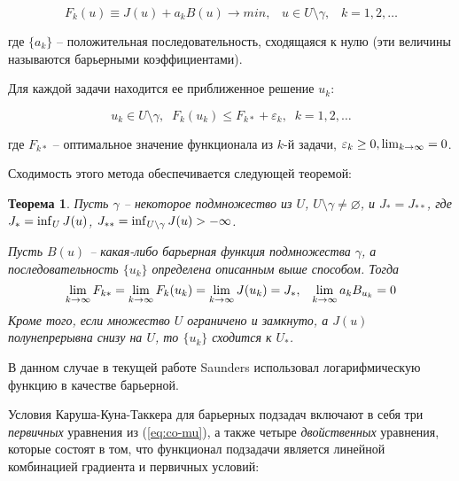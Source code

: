\documentclass[a4paper, 12pt, titlepage]{article}
\theoremstyle{definition}
\theoremstyle{plain}
\newtheorem{SmartTheorem}{Теорема}
\theoremstyle{plain}
\begin{document}
\begin{equation}
 F_{k}(u) \equiv J(u) + a_{k} B(u) \to min, \;\;\; u \in U \setminus \gamma, 
\;\;\;
 k = 1, 2, \ldots
\end{equation}

где $\{a_{k}\}$ -- положительная последовательность, сходящаяся к нулю (эти 
величины называются барьерными коэффициентами).

Для каждой задачи находится ее приближенное решение $u_{k}$:

\begin{equation}
 u_{k} \in U \setminus \gamma, \;\; F_{k}(u_{k}) \leq F_{k*} + \varepsilon_{k},
 \;\; k = 1, 2, \ldots
\end{equation}

где $F_{k*}$ -- оптимальное значение функционала из $k$-й задачи,
$\varepsilon_{k} \geq 0, \operatornamewithlimits{lim}_{k \to \infty} = 0$.

Сходимость этого метода обеспечивается следующей теоремой:

\begin{SmartTheorem}
 Пусть $\gamma$ -- некоторое подмножество из $U$,
 $U \setminus \gamma \neq \varnothing$, и $J_{*} = J_{**}$, где
 $J_{*} = \operatornamewithlimits{inf}_{U} J(u)$,
 $J_{**} = \operatornamewithlimits{inf}_{U \setminus \gamma} J(u) > -\infty$.
 
 Пусть $B(u)$ -- какая-либо барьерная функция подмножества $\gamma$, а
 последовательность $\{u_{k}\}$ определена описанным выше способом. Тогда
 \begin{equation}
  \operatornamewithlimits{lim}_{k \to \infty} F_{k*} =
  \operatornamewithlimits{lim}_{k \to \infty} F_{k}(u_{k}) =
  \operatornamewithlimits{lim}_{k \to \infty} J(u_{k}) = J_{*}, \;\;\;
  \operatornamewithlimits{lim}_{k \to \infty} a_{k} B_{u_{k}} = 0
 \end{equation}
 Кроме того, если множество $U$ ограничено и замкнуто, а $J(u)$
 полунепрерывна снизу на $U$, то $\{u_{k}\}$ сходится к $U_{*}$.
\end{SmartTheorem}

В данном случае в текущей работе Saunders использовал логарифмическую функцию в
качестве барьерной.

Условия Каруша-Куна-Таккера для барьерных подзадач включают в себя три 
\textit{первичных} уравнения из (\ref{eq:co-mu}), а также четыре 
\textit{двойственных} уравнения, которые состоят в том, что функционал
подзадачи является линейной комбинацией градиента и первичных условий:
\end{document}
